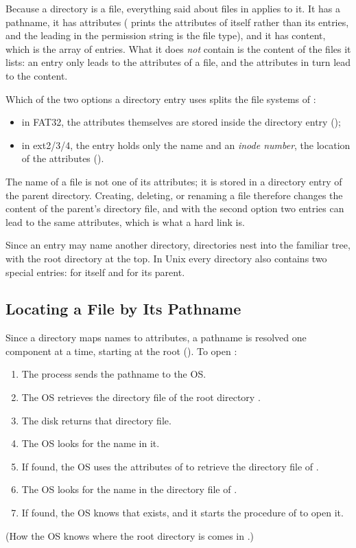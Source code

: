 Because a directory is a file, everything said about files in  applies to it. It has a pathname, it has attributes ( prints the attributes of  itself rather than its entries, and the leading  in the permission string is the file type), and it has content, which is the array of entries. What it does \emph{not} contain is the content of the files it lists: an entry only leads to the attributes of a file, and the attributes in turn lead to the content.

Which of the two options a directory entry uses splits the file systems of :
\begin{itemize}
  \item in FAT32, the attributes themselves are stored inside the directory entry ();
  \item in ext2/3/4, the entry holds only the name and an \emph{inode number}, the location of the attributes ().
\end{itemize}

\begin{keypoint}
  \label{kp:nameinparent}
  The name of a file is not one of its attributes; it is stored in a directory entry of the parent directory. Creating, deleting, or renaming a file therefore changes the content of the parent's directory file, and with the second option two entries can lead to the same attributes, which is what a hard link is.
\end{keypoint}

Since an entry may name another directory, directories nest into the familiar tree, with the root directory \code{/} at the top. In Unix every directory also contains two special entries:  for itself and  for its parent.

\subsection{Locating a File by Its Pathname}
\label{sec:lookup}

Since a directory maps names to attributes, a pathname is resolved one component at a time, starting at the root (). To open :
\begin{enumerate}
  \item The process sends the pathname  to the OS.
  \item The OS retrieves the directory file of the root directory \code{/}.
  \item The disk returns that directory file.
  \item The OS looks for the name  in it.
  \item If found, the OS uses the attributes of  to retrieve the directory file of .
  \item The OS looks for the name  in the directory file of .
  \item If found, the OS knows that  exists, and it starts the procedure of  to open it.
\end{enumerate}
(How the OS knows where the root directory is comes in .)

